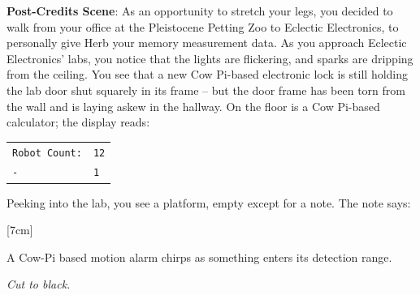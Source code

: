 {\large \textbf{Post-Credits Scene}:} As an opportunity to stretch your legs,
you decided to walk from your office at the Pleistocene Petting Zoo to Eclectic
Electronics, to personally give Herb your memory measurement data. As you
approach Eclectic Electronics' labs, you notice that the lights are flickering,
and sparks are dripping from the ceiling. You see that a new Cow Pi-based
electronic lock is still holding the lab door shut squarely in its frame -- but
the door frame has been torn from the wall and is laying askew in the hallway.
On the floor is a Cow Pi-based calculator; the display reads: \\
\begin{tabular}{>{\raggedleft}p{3.5cm}>{\raggedleft\arraybackslash}p{1cm}}
    \rowcolor{LightGreen}\texttt{Robot Count:\phantom{xxxx}} & \texttt{12} \\
    \rowcolor{LightGreen}\texttt{-} & \texttt{1}
\end{tabular}


Peeking into the lab, you see a platform, empty except for a note. The note says:

\begin{center}[7cm]\end{center}

A Cow-Pi based motion alarm chirps as something enters its detection range.

\textit{Cut to black.}


